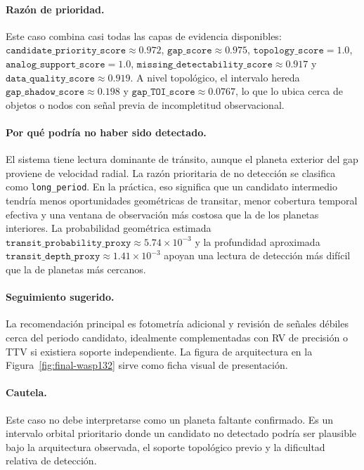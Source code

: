 \paragraph{Raz\'on de prioridad.}
Este caso combina casi todas las capas de evidencia disponibles: \(\texttt{candidate\_priority\_score}\approx 0.972\), \(\texttt{gap\_score}\approx 0.975\), \(\texttt{topology\_score}=1.0\), \(\texttt{analog\_support\_score}=1.0\), \(\texttt{missing\_detectability\_score}\approx 0.917\) y \(\texttt{data\_quality\_score}\approx 0.919\). A nivel topol\'ogico, el intervalo hereda \(\texttt{gap\_shadow\_score}\approx 0.198\) y \(\texttt{gap\_TOI\_score}\approx 0.0767\), lo que lo ubica cerca de objetos o nodos con se\~nal previa de incompletitud observacional.

\paragraph{Por qu\'e podr\'ia no haber sido detectado.}
El sistema tiene lectura dominante de tr\'ansito, aunque el planeta exterior del gap proviene de velocidad radial. La raz\'on prioritaria de no detecci\'on se clasifica como \texttt{long\_period}. En la pr\'actica, eso significa que un candidato intermedio tendr\'ia menos oportunidades geom\'etricas de transitar, menor cobertura temporal efectiva y una ventana de observaci\'on m\'as costosa que la de los planetas interiores. La probabilidad geom\'etrica estimada \(\texttt{transit\_probability\_proxy}\approx 5.74\times 10^{-3}\) y la profundidad aproximada \(\texttt{transit\_depth\_proxy}\approx 1.41\times 10^{-3}\) apoyan una lectura de detecci\'on m\'as dif\'icil que la de planetas m\'as cercanos.

\paragraph{Seguimiento sugerido.}
La recomendaci\'on principal es fotometr\'ia adicional y revisi\'on de se\~nales d\'ebiles cerca del periodo candidato, idealmente complementadas con RV de precisi\'on o TTV si existiera soporte independiente. La figura de arquitectura en la Figura~\ref{fig:final-wasp132} sirve como ficha visual de presentaci\'on.

\paragraph{Cautela.}
Este caso no debe interpretarse como un planeta faltante confirmado. Es un intervalo orbital prioritario donde un candidato no detectado podr\'ia ser plausible bajo la arquitectura observada, el soporte topol\'ogico previo y la dificultad relativa de detecci\'on.

